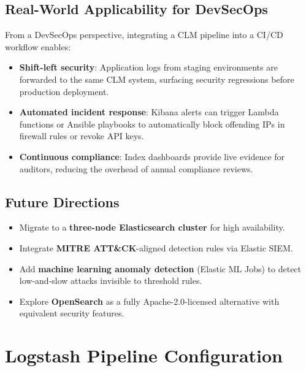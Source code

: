 \documentclass[12pt,a4paper]{report}
\begin{document}
\section{Real-World Applicability for DevSecOps}

From a DevSecOps perspective, integrating a CLM pipeline into a CI/CD workflow enables:
\begin{itemize}[leftmargin=1.5em]
    \item \textbf{Shift-left security}: Application logs from staging environments are
          forwarded to the same CLM system, surfacing security regressions before
          production deployment.
    \item \textbf{Automated incident response}: Kibana alerts can trigger Lambda
          functions or Ansible playbooks to automatically block offending IPs in
          firewall rules or revoke API keys.
    \item \textbf{Continuous compliance}: Index dashboards provide live evidence for
          auditors, reducing the overhead of annual compliance reviews.
\end{itemize}

\section{Future Directions}

\begin{itemize}[leftmargin=1.5em]
    \item Migrate to a \textbf{three-node Elasticsearch cluster} for high availability.
    \item Integrate \textbf{MITRE ATT\&CK}-aligned detection rules via Elastic SIEM.
    \item Add \textbf{machine learning anomaly detection} (Elastic ML Jobs) to detect
          low-and-slow attacks invisible to threshold rules.
    \item Explore \textbf{OpenSearch} as a fully Apache-2.0-licensed alternative with
          equivalent security features.
\end{itemize}


\appendix

\chapter{Logstash Pipeline Configuration}
\end{document}
